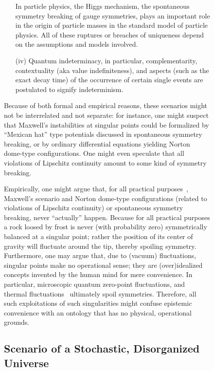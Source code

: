 \documentclass[entropy,article,accept,oneauthor,pdftex]{Definitions/mdpi}
\begin{document}
\begin{figure}[H]
\begin{itemize}
In particle physics, the Higgs mechanism, the spontaneous symmetry breaking of gauge symmetries,
plays an important role in the origin of particle masses in
the standard model of particle physics.
All of these ruptures or breaches of uniqueness depend on the assumptions and models involved.

\item[(iv)]
Quantum indeterminacy, in particular, complementarity, contextuality ({aka} value indefiniteness),
and aspects (such as the exact decay time) of the occurrence of certain single events are postulated to signify indeterminism.
\end{itemize}

Because of both formal and empirical reasons, these scenarios might not be interrelated and not separate:
for instance, one might suspect that Maxwell's
instabilities at singular points could be formalized by ``Mexican hat'' type potentials discussed in spontaneous symmetry breaking,
or by ordinary differential equations yielding Norton dome-type configurations.
One might even speculate that all violations of Lipschitz continuity amount to some kind of symmetry breaking.

Empirically, one might argue that, for all practical purposes~\cite{bell-a}, Maxwell's scenario and Norton dome-type configurations
(related to violations of Lipschitz continuity) or spontaneous symmetry breaking, never ``actually'' happen.
Because for all practical purposes a rock loosed by frost is never (with probability zero)
symmetrically balanced at a singular point; rather the position of its center of gravity will
fluctuate around the tip, thereby spoiling symmetry.
Furthermore, one may argue that, due to (vacuum) fluctuations, singular points make no operational sense; they
are (over)idealized concepts invented by the human mind for mere convenience.
In particular, microscopic quantum zero-point fluctuations, and thermal fluctuations~\cite{Smoluchovski-1912}
ultimately spoil symmetries.
Therefore, all such exploitations of such singularities might confuse epistemic convenience with an ontology that has no physical, operational grounds.

\subsection{Scenario of a Stochastic, Disorganized Universe}


\end{figure}
\end{document}
